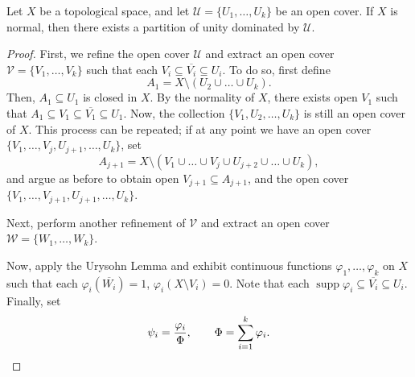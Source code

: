\documentclass[11pt]{article}
\DeclareMathOperator{\supp}{supp}
\theoremstyle{definition}
\theoremstyle{remark}
\numberwithin{equation}{section}
\begin{document}
    \begin{lemma}
        Let $X$ be a topological space, and let $\mathscr{U} = \{U_1, \dots, U_k\}$
        be an open cover. If $X$ is normal, then there exists a partition of unity
        dominated by $\mathscr{U}$.
    \end{lemma}
    \begin{proof}
        First, we refine the open cover $\mathscr{U}$ and extract an open cover
        $\mathscr{V} = \{V_1, \dots, V_k\}$ such that each $V_i \subseteq
        \overline{V_i} \subseteq U_i$. To do so, first define \[
            A_1 = X \setminus (U_2 \cup \dots \cup U_k).
        \] Then, $A_1 \subseteq U_1$ is closed in $X$. By the normality of $X$, there
        exists open $V_1$ such that $A_1 \subseteq V_1 \subseteq \overline{V_1}
        \subseteq U_1$. Now, the collection $\{V_1, U_2, \dots, U_k\}$ is still an
        open cover of $X$. This process can be repeated; if at any point we have an
        open cover $\{V_1, \dots, V_j, U_{j + 1}, \dots, U_k\}$, set \[
            A_{j + 1} = X\setminus (V_1 \cup \dots \cup V_j \cup U_{j + 2} \cup \dots
            \cup U_k),
        \] and argue as before to obtain open $V_{j + 1} \subseteq A_{j + 1}$, and
        the open cover $\{V_1, \dots, V_{j + 1}, U_{j + 1}, \dots, U_k\}$.
        
        Next, perform another refinement of $\mathscr{V}$ and extract an open cover
        $\mathscr{W} = \{W_1, \dots, W_k\}$.

        Now, apply the Urysohn Lemma and exhibit continuous functions $\varphi_1,
        \dots, \varphi_k$ on $X$ such that each $\varphi_i(\overline{W_i}) = 1$,
        $\varphi_i(X\setminus V_i) = 0$. Note that each $\supp{\varphi_i} \subseteq
        \overline{V_i} \subseteq U_i$. Finally, set \[
            \psi_i = \frac{\varphi_i}{\Phi}, \qquad \Phi = \sum_{i = 1}^k \varphi_i.
            \qedhere
        \] 
    \end{proof}
\end{document}
